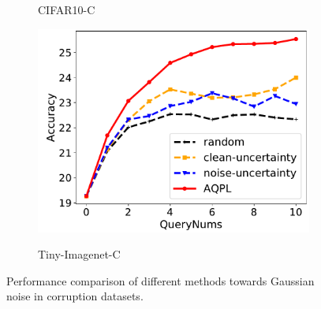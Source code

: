 \documentclass[letterpaper]{article} %
\begin{document}
\begin{figure}[!t]
\begin{subfigure}{0.3\linewidth}
		\caption{CIFAR10-C}
	\end{subfigure}
	\begin{subfigure}{0.3\linewidth}
		\centering
		\label{fig.TinyImagenet.Gaussian}
		\includegraphics[width=1\textwidth]{img/Resnet18-TinyImageNet-GuassianNoise.pdf}\\
		\caption{Tiny-Imagenet-C}
	\end{subfigure}

	\caption{Performance comparison of different methods towards Gaussian noise in corruption datasets.}
	\label{fig.comp.Gaussian}
\end{figure}
\end{document}
